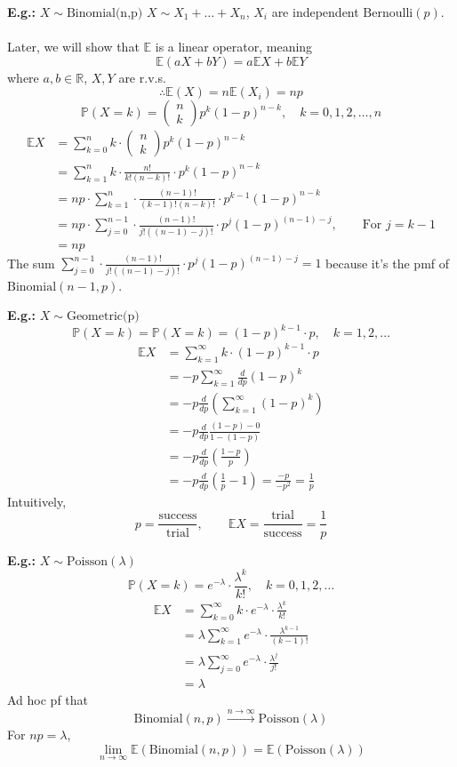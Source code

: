 \documentclass[a4paper]{article}
\newcommand{\n}{\hfill\break}
\newcommand{\eg}[1]{\par\noindent\settowidth{\hangindent}{\textbf{E.g.: }}\textbf{E.g.: }#1\n}
\newcommand{\reals}{\mathbb{R}}
\newcommand{\R}{\reals}
\newcommand{\Prob}{\mathbb{P}}
\renewcommand{\P}{\Prob}
\newcommand{\Avg}{\mathbb{E}}
\newcommand{\E}{\Avg}
\begin{document}
\eg{$X\sim\text{Binomial(n,p)}$
$X\sim X_1+\dots+X_n$, $X_i$ are independent $\text{Bernoulli}(p)$.
\\\\
Later, we will show that $\E$ is a linear operator, meaning
\[\E(aX+bY)=a\E X+b\E Y\]
where $a, b\in\R$, $X, Y$ are r.v.s.
\[\therefore\E(X)=n\E(X_i)=np\]
\[\P(X=k)=\begin{pmatrix}n\\k\end{pmatrix}p^k(1-p)^{n-k}, \quad k=0,1,2,\dots,n\]
\begin{align*}
    \E X&=\sum^n_{k=0}k\cdot\begin{pmatrix}n\\k\end{pmatrix}p^k(1-p)^{n-k} \\
    &=\sum^n_{k=1}k\cdot\frac{n!}{k!(n-k)!}\cdot p^k(1-p)^{n-k} \\
    &=np\cdot\sum^n_{k=1}\cdot\frac{(n-1)!}{(k-1)!(n-k)!}\cdot p^{k-1}(1-p)^{n-k} \\
    &=np\cdot\sum^{n-1}_{j=0}\cdot\frac{(n-1)!}{j!((n-1)-j)!}\cdot p^j(1-p)^{(n-1)-j}, \qquad\text{For $j=k-1$}\\
    &=np
\end{align*}
The sum $\sum^{n-1}_{j=0}\cdot\frac{(n-1)!}{j!((n-1)-j)!}\cdot p^j(1-p)^{(n-1)-j} = 1$ because it's the pmf of $\text{Binomial}(n-1,p)$.

}


\eg{$X\sim\text{Geometric(p)}$
\[\P(X=k)=\P(X=k)=(1-p)^{k-1}\cdot p,\quad k=1, 2, \dots\]
\begin{align*}
    \E X&=\sum^\infty_{k=1}k\cdot(1-p)^{k-1}\cdot p \\
    &=-p\sum^\infty_{k=1}\frac{d}{dp}(1-p)^k \\
    &=-p\frac{d}{dp}\left(\sum^\infty_{k=1}(1-p)^k\right) \\
    &=-p\frac{d}{dp}\frac{(1-p)-0}{1-(1-p)} \\
    &=-p\frac{d}{dp}(\frac{1-p}{p}) \\
    &=-p\frac{d}{dp}(\frac{1}{p}-1) =\frac{-p}{-p^2} =\frac{1}{p}
\end{align*}
Intuitively, \[p=\frac{\text{success}}{\text{trial}},\qquad\E X=\frac{\text{trial}}{\text{success}}=\frac{1}{p}\]
}

\eg{$X\sim\text{Poisson}(\lambda)$
\[\P(X=k)=e^{-\lambda}\cdot\frac{\lambda^k}{k!},\quad k=0, 1, 2, \dots\]
\begin{align*}
    \E X&=\sum^\infty_{k=0}k\cdot e^{-\lambda}\cdot\frac{\lambda^k}{k!} \\
    &=\lambda\sum^\infty_{k=1} e^{-\lambda}\cdot\frac{\lambda^{k-1}}{(k-1)!} \\
    &=\lambda\sum^\infty_{j=0} e^{-\lambda}\cdot\frac{\lambda^j}{j!} \\
    &=\lambda
\end{align*}
Ad hoc pf that
\[\text{Binomial}(n,p)\xrightarrow{n\rightarrow\infty}\text{Poisson}(\lambda)\]
For $np=\lambda$,
\[\lim_{n\rightarrow\infty}\E(\text{Binomial}(n,p))=\E(\text{Poisson}(\lambda))\]
}
\end{document}
